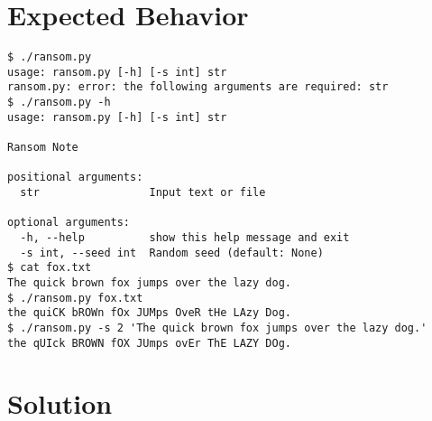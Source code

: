 \documentclass[]{article}
\begin{document}
\hypertarget{expected-behavior-2}{%
\section{Expected Behavior}\label{expected-behavior-2}}

\begin{verbatim}
$ ./ransom.py
usage: ransom.py [-h] [-s int] str
ransom.py: error: the following arguments are required: str
$ ./ransom.py -h
usage: ransom.py [-h] [-s int] str

Ransom Note

positional arguments:
  str                 Input text or file

optional arguments:
  -h, --help          show this help message and exit
  -s int, --seed int  Random seed (default: None)
$ cat fox.txt
The quick brown fox jumps over the lazy dog.
$ ./ransom.py fox.txt
the quiCK bROWn fOx JUMps OveR tHe LAzy Dog.
$ ./ransom.py -s 2 'The quick brown fox jumps over the lazy dog.'
the qUIck BROWN fOX JUmps ovEr ThE LAZY DOg.
\end{verbatim}

\pagebreak

\hypertarget{solution-8}{%
\section{Solution}\label{solution-8}}
\end{document}
